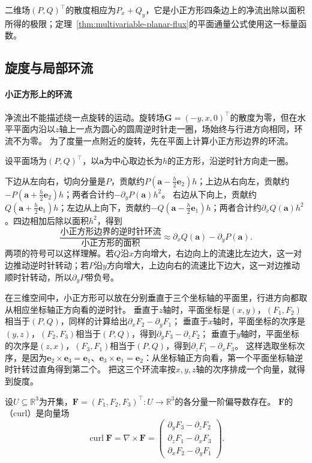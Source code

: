 二维场$(P,Q)^\top$的散度相应为$P_x+Q_y$，它是小正方形四条边上的净流出除以面积所得的极限；定理~\ref{thm:multivariable-planar-flux}的平面通量公式使用这一标量函数。

\subsection{旋度与局部环流}

\paragraph{小正方形上的环流}

净流出不能描述绕一点旋转的运动。旋转场$\bm G=(-y,x,0)^\top$的散度为零，但在水平平面内沿以$z$轴上一点为圆心的圆周逆时针走一圈，场始终与行进方向相同，环流不为零。
为了度量一点附近的旋转，先在平面上计算小正方形边界的环流。

设平面场为$(P,Q)^\top$，以$\bm a$为中心取边长为$h$的正方形，沿逆时针方向走一圈。

下边从左向右，切向分量是$P$，贡献约$P(\bm a-\tfrac h2\bm e_2)h$；上边从右向左，贡献约$-P(\bm a+\tfrac h2\bm e_2)h$；两者合计约$-\partial_yP(\bm a)h^2$。
右边从下向上，贡献约$Q(\bm a+\tfrac h2\bm e_1)h$；左边从上向下，贡献约$-Q(\bm a-\tfrac h2\bm e_1)h$；两者合计约$\partial_xQ(\bm a)h^2$。四边相加后除以面积$h^2$，得到
\[
 \frac{\text{小正方形边界的逆时针环流}}{\text{小正方形的面积}}
 \approx\partial_xQ(\bm a)-\partial_yP(\bm a).
\]
两项的符号可以这样理解。若$Q$沿$x$方向增大，右边向上的流速比左边大，这一对边推动逆时针转动；若$P$沿$y$方向增大，上边向右的流速比下边大，这一对边推动顺时针转动，所以$\partial_yP$带负号。

在三维空间中，小正方形可以放在分别垂直于三个坐标轴的平面里，行进方向都取从相应坐标轴正方向看的逆时针。
垂直于$z$轴时，平面坐标是$(x,y)$，$(F_1,F_2)$相当于$(P,Q)$，同样的计算给出$\partial_xF_2-\partial_yF_1$；
垂直于$x$轴时，平面坐标的次序是$(y,z)$，$(F_2,F_3)$相当于$(P,Q)$，得到$\partial_yF_3-\partial_zF_2$；
垂直于$y$轴时，平面坐标的次序是$(z,x)$，$(F_3,F_1)$相当于$(P,Q)$，得到$\partial_zF_1-\partial_xF_3$。
这样选取坐标次序，是因为$\bm e_2\times\bm e_3=\bm e_1$、$\bm e_3\times\bm e_1=\bm e_2$：从坐标轴正方向看，第一个平面坐标轴逆时针转过直角得到第二个。
把这三个环流率按$x,y,z$轴的次序排成一个向量，就得到旋度。
\begin{definition}[旋度]
\label{def:multivariable-curl}
设$U\subseteq\mathbb R^3$为开集，$\bm F=(F_1,F_2,F_3)^\top:U\to\mathbb R^3$的各分量一阶偏导数存在。
$\bm F$的（curl）是向量场
\[
 \operatorname{curl}\bm F=\nabla\times\bm F
 =\begin{pmatrix}
   \partial_yF_3-\partial_zF_2\\
   \partial_zF_1-\partial_xF_3\\
   \partial_xF_2-\partial_yF_1
  \end{pmatrix}.
\]
\end{definition}

